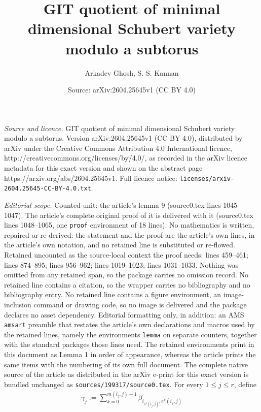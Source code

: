 \documentclass[10pt,a4paper]{amsart}
\title{GIT quotient of minimal dimensional Schubert variety modulo a subtorus}
\author{Arkadev Ghosh, S. S. Kannan}
\date{Source: arXiv:2604.25645v1 (CC BY 4.0)}
\begin{document}
\maketitle

\noindent\emph{Source and licence.} GIT quotient of minimal dimensional Schubert variety modulo a subtorus. Version arXiv:2604.25645v1 (CC BY 4.0), distributed by arXiv under the Creative Commons Attribution 4.0 International licence, http://creativecommons.org/licenses/by/4.0/, as recorded in the arXiv licence metadata for this exact version and shown on the abstract page https://arxiv.org/abs/2604.25645v1. Full licence notice: \texttt{licenses/arxiv-2604.25645-CC-BY-4.0.txt}.\par\smallskip

\noindent\textit{Editorial scope.} Counted unit: the article's lemma 9 (source0.tex lines 1045--1047). The article's complete original proof of it is delivered with it (source0.tex lines 1048--1065, one \texttt{proof} environment of 18 lines). No mathematics is written, repaired or re-derived: the statement and the proof are the article's own lines, in the article's own notation, and no retained line is substituted or re-flowed.  Retained uncounted as the source-local context the proof needs: lines 459--461; lines 874--895; lines 956--962; lines 1019--1023; lines 1031--1033.  Nothing was omitted from any retained span, so the package carries no omission record.  No retained line contains a citation, so the wrapper carries no bibliography and no bibliography entry.  No retained line contains a figure environment, an image-inclusion command or drawing code, so no image is delivered and the package declares no asset dependency.  Editorial formatting only, in addition: an AMS \texttt{amsart} preamble that restates the article's own declarations and macros used by the retained lines, namely the environments \texttt{lemma} on separate counters, together with the standard packages those lines need.  The retained environments print in this document as Lemma 1 in order of appearance, whereas the article prints the same items with the numbering of its own full document.  The complete native source of the article as distributed in the arXiv e-print for this exact version is bundled unchanged as \texttt{sources/199317/source0.tex}.
For every $1\leq j\leq r$, define \begin{align}\label{eq 1.14}
	\gamma_{j}:=\sum_{k=0}^{m(i_{j},j)-1}\beta_{i_{e^{k}(i_{j},j)},e^{k}(i_{j},j)}
\end{align} 
\end{document}
